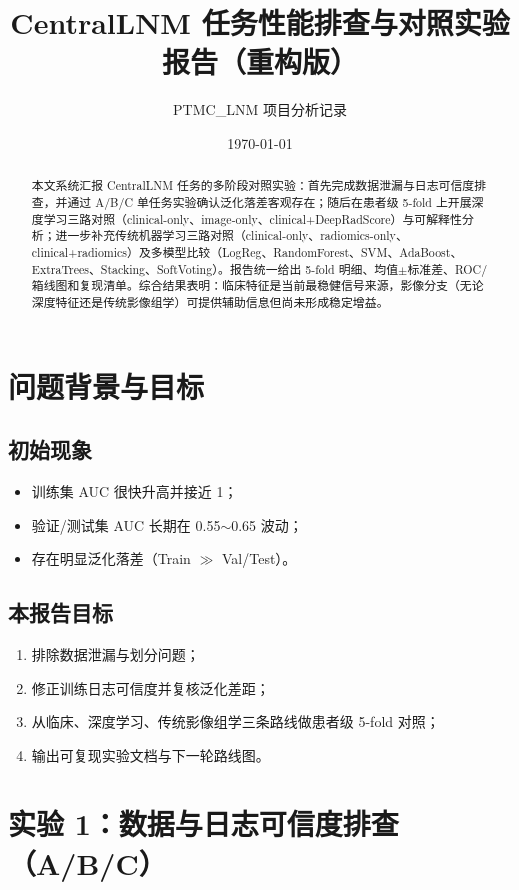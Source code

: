 \documentclass[12pt,a4paper]{ctexart}
\title{CentralLNM 任务性能排查与对照实验报告（重构版）}
\author{PTMC\_LNM 项目分析记录}
\date{\today}
\begin{document}
\maketitle

\begin{abstract}
本文系统汇报 CentralLNM 任务的多阶段对照实验：首先完成数据泄漏与日志可信度排查，并通过 A/B/C 单任务实验确认泛化落差客观存在；随后在患者级 5-fold 上开展深度学习三路对照（clinical-only、image-only、clinical+DeepRadScore）与可解释性分析；进一步补充传统机器学习三路对照（clinical-only、radiomics-only、clinical+radiomics）及多模型比较（LogReg、RandomForest、SVM、AdaBoost、ExtraTrees、Stacking、SoftVoting）。报告统一给出 5-fold 明细、均值$\pm$标准差、ROC/箱线图和复现清单。综合结果表明：临床特征是当前最稳健信号来源，影像分支（无论深度特征还是传统影像组学）可提供辅助信息但尚未形成稳定增益。
\end{abstract}

\tableofcontents
\newpage

\section{问题背景与目标}

\subsection{初始现象}
\begin{itemize}
  \item 训练集 AUC 很快升高并接近 1；
  \item 验证/测试集 AUC 长期在 0.55$\sim$0.65 波动；
  \item 存在明显泛化落差（Train $\gg$ Val/Test）。
\end{itemize}

\subsection{本报告目标}
\begin{enumerate}
  \item 排除数据泄漏与划分问题；
  \item 修正训练日志可信度并复核泛化差距；
  \item 从临床、深度学习、传统影像组学三条路线做患者级 5-fold 对照；
  \item 输出可复现实验文档与下一轮路线图。
\end{enumerate}

\section{实验 1：数据与日志可信度排查（A/B/C）}
\end{document}
